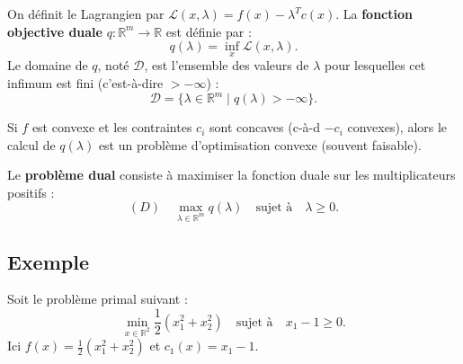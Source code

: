 \begin{definition}
    On définit le Lagrangien par $\mathcal{L}(x, \lambda) = f(x) - \lambda^T c(x)$.
    La \textbf{fonction objective duale} $q: \mathbb{R}^m \to \mathbb{R}$ est définie par :
    \begin{equation}
        q(\lambda) = \inf_x \mathcal{L}(x, \lambda).
    \end{equation}
    Le domaine de $q$, noté $\mathcal{D}$, est l'ensemble des valeurs de $\lambda$ pour lesquelles cet infimum est fini (c'est-à-dire $> -\infty$) :
    \begin{equation}
        \mathcal{D} = \{ \lambda \in \mathbb{R}^m \mid q(\lambda) > -\infty \}.
    \end{equation}
\end{definition}

Si $f$ est convexe et les contraintes $c_i$ sont concaves (c-à-d $-c_i$ convexes), alors le calcul de $q(\lambda)$ est un problème d'optimisation convexe (souvent faisable).

\begin{definition}
    Le \textbf{problème dual} consiste à maximiser la fonction duale sur les multiplicateurs positifs :
    \begin{equation}
        (D) \quad \max_{\lambda \in \mathbb{R}^m} q(\lambda) \quad \text{sujet à} \quad \lambda \geq 0.
    \end{equation}
\end{definition}

\subsection{Exemple}

Soit le problème primal suivant :
\begin{equation}
    \min_{x \in \mathbb{R}^2} \frac{1}{2}(x_1^2 + x_2^2) \quad \text{sujet à} \quad x_1 - 1 \geq 0.
\end{equation}
Ici $f(x) = \frac{1}{2}(x_1^2 + x_2^2)$ et $c_1(x) = x_1 - 1$.

